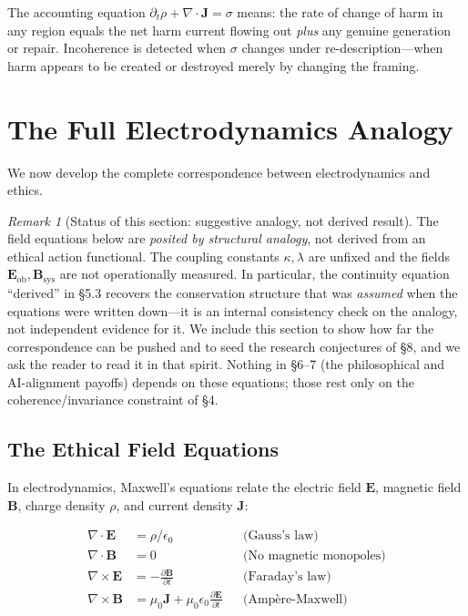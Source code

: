 \documentclass[12pt,letterpaper]{article}
\theoremstyle{definition}
\theoremstyle{remark}
\newtheorem{remark}[theorem]{Remark}
\begin{document}
The accounting equation $\partial_t \rho + \nabla \cdot \mathbf{J} = \sigma$ means: the rate of change of harm in any region equals the net harm current flowing out \textit{plus} any genuine generation or repair. Incoherence is detected when $\sigma$ changes under re-description---when harm appears to be created or destroyed merely by changing the framing.

\section{The Full Electrodynamics Analogy}

We now develop the complete correspondence between electrodynamics and ethics.

\begin{remark}[Status of this section: suggestive analogy, not derived result]
The field equations below are \emph{posited by structural analogy}, not derived from an ethical action functional. The coupling constants $\kappa,\lambda$ are unfixed and the fields $\mathbf{E}_\text{ob},\mathbf{B}_\text{sys}$ are not operationally measured. In particular, the continuity equation ``derived'' in \S5.3 recovers the conservation structure that was \emph{assumed} when the equations were written down---it is an internal consistency check on the analogy, not independent evidence for it. We include this section to show how far the correspondence can be pushed and to seed the research conjectures of \S8, and we ask the reader to read it in that spirit. Nothing in \S6--7 (the philosophical and AI-alignment payoffs) depends on these equations; those rest only on the coherence/invariance constraint of \S4.
\end{remark}

\subsection{The Ethical Field Equations}

In electrodynamics, Maxwell's equations relate the electric field $\mathbf{E}$, magnetic field $\mathbf{B}$, charge density $\rho$, and current density $\mathbf{J}$:

\begin{align}
\nabla \cdot \mathbf{E} &= \rho / \epsilon_0 && \text{(Gauss's law)} \\
\nabla \cdot \mathbf{B} &= 0 && \text{(No magnetic monopoles)} \\
\nabla \times \mathbf{E} &= -\frac{\partial \mathbf{B}}{\partial t} && \text{(Faraday's law)} \\
\nabla \times \mathbf{B} &= \mu_0 \mathbf{J} + \mu_0 \epsilon_0 \frac{\partial \mathbf{E}}{\partial t} && \text{(Amp\`{e}re-Maxwell)}
\end{align}
\end{document}
